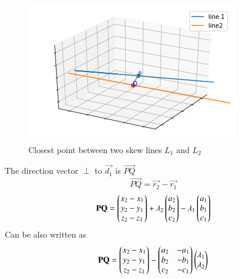 \documentclass[journal,12pt,twocolumn]{IEEEtran}
\begin{document}
\begin{figure}[h]
    \centering
    \includegraphics[width=\columnwidth]{fig/figure1.png}
    \caption{Closest point between two skew lines $L_1$ and $L_2$}
    \label{fig:1}
\end{figure}
The direction vector $\perp$ to $\vec{d_1}$ is $\vec{PQ}$
\begin{equation}
    \vec{PQ} = \vec{r_2} - \vec{r_1}
\end{equation}
\begin{equation}
    \mathbf{PQ} = \begin{pmatrix}x_2 - x_1\\y_2 - y_1\\z_2 - z_1\end{pmatrix} + \lambda{_2}\begin{pmatrix}a_2\\b_2\\c_2\end{pmatrix} -  \lambda{_1}\begin{pmatrix}a_1\\b_1\\c_1\end{pmatrix}
\end{equation}
Can be also written as
\begin{equation}
    \mathbf{PQ} = \begin{pmatrix}x_2 - x_1\\y_2 - y_1\\z_2 - z_1\end{pmatrix} - \begin{pmatrix}a_2 & -a_1\\b_2 & -b_1\\c_2 & -c_1\end{pmatrix}\begin{pmatrix}\lambda{_1}\\\lambda{_2}\end{pmatrix}
\end{equation}
\end{document}
